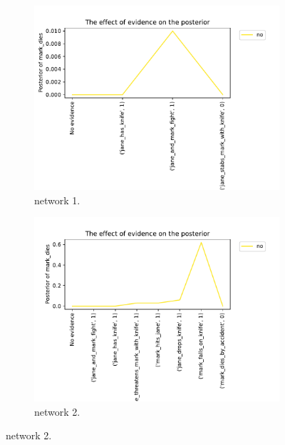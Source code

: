 \begin{enumerate}
\begin{figure}[htbp]
\begin{subfigure}{.5\textwidth}
 \centering
\includegraphics[width=0.95\linewidth]{../experiments/VlekNetwork/plots/posterior_base_networkKB1.pdf}
\caption{ network 1.}
\label{kb1a}
\end{subfigure}%
\begin{subfigure}{.5\textwidth}
\centering
\includegraphics[width=0.95\linewidth]{../experiments/VlekNetwork/plots/posterior_base_networkKB2.pdf}
\caption{ network 2.}
\label{kb2a}
\end{subfigure}



\end{figure}
\end{enumerate}
